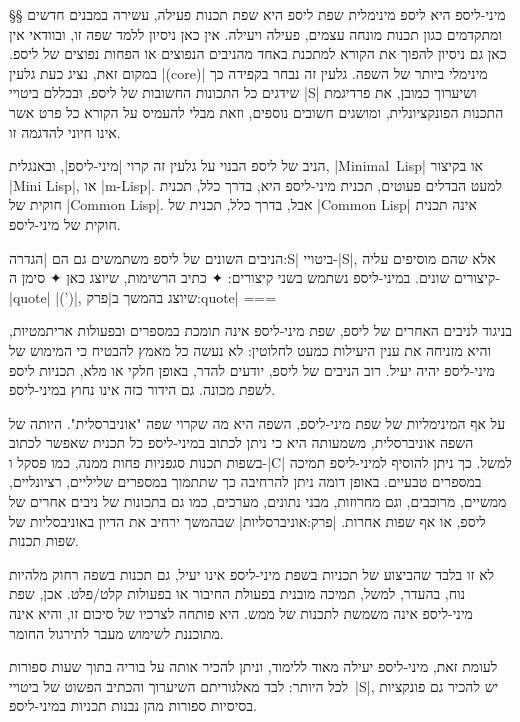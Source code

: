 §§ מיני-ליספ היא ליספ מינימלית 
שפת ליספ היא שפת תכנות פעילה, עשירה במבנים חדשים ומתקדמים כגון תכנות מונחה
עצמים, פעילה ויעילה. אין כאן ניסיון ללמד שפה זו, ובוודאי אין כאן גם ניסיון
להפוך את הקורא למתכנת באחד מהניבים הנפוצים או הפחות נפוצים של ליספ. במקום זאת,
נציג כעת גלעין \E|(core)| מינימלי ביותר של השפה. גלעין זה נבחר בקפידה כך שידגים
כל התכונות החשובות של ליספ, ובכללם ביטויי \E|S| ושיערוך כמובן, את פרדיגמת
התכנות הפונקציונלית, ומושגים חשובים נוספים, וזאת מבלי להעמיס על הקורא כל פרט
אשר אינו חיוני להדגמה זו.

הניב של ליספ הבנוי על גלעין זה קרוי \ע|מיני-ליספ|, ובאנגלית, \E|Minimal~Lisp|
או בקיצור \E|Mini Lisp|, או \E|m-Lisp|. למעט הבדלים פעוטים, תכנית מיני-ליספ
היא, בדרך כלל, תכנית חוקית של \E|Common Lisp|. אבל, בדרך כלל, תכנית של
\E|Common Lisp| אינה תכנית חוקית של מיני-ליספ.

הניבים השונים של ליספ משתמשים גם הם |הגדרה:S| ביטויי-\E|S|, אלא שהם מוסיפים
עליה קיצורים שונים. במיני-ליספ נשתמש בשני קיצורים:
✦ כתיב הרשימות, שיוצג כאן
✦ סימן ה-\E|quote| \E|(')|, שיוצג בהמשך ב|פרק:quote|
===

בניגוד לניבים האחרים של ליספ, שפת מיני-ליספ אינה תומכת במספרים ובפעולות
אריתמטיות, והיא מזניחה את ענין היעילות כמעט לחלוטין: לא נעשה כל מאמץ להבטיח כי
המימוש של מיני-ליספ יהיה יעיל. רוב הניבים של ליספ, יודעים להדר, באופן
חלקי או מלא, תכניות ליספ לשפת מכונה. גם הידור כזה אינו נחוץ במיני-ליספ.

על אף המינימליות של שפת מיני-ליספ, השפה היא מה שקרוי שפה "אוניברסלית". היותה של
השפה אוניברסלית, משמעותה היא כי ניתן לכתוב במיני-ליספ כל תכנית שאפשר לכתוב
בשפות תכנות סגפניות פחות ממנה, כמו פסקל ו-\E|C| למשל. כך ניתן להוסיף למיני-ליספ
תמיכה במספרים טבעיים. באופן דומה ניתן להרחיבה כך שתתמוך במספרים שליליים,
רציונליים, ממשיים, מרוכבים, וגם מחרוזות, מבני נתונים, מערכים, כמו גם בתכונות של
ניבים אחרים של ליספ, או אף שפות אחרות. |פרק:אוניברסליות| שבהמשך ירחיב את
הדיון באוניבסליות של שפות תכנות.

לא זו בלבד שהביצוע של תכניות בשפת מיני-ליספ אינו יעיל, גם תכנות בשפה רחוק
מלהיות נוח, בהעדר, למשל, תמיכה מובנית בפעולת החיבור או בפעולות קלט/פלט. אכן,
שפת מיני-ליספ אינה משמשת לתכנות של ממש. היא פותחה לצרכיו של סיכום זו, והיא אינה
מתוכננת לשימוש מעבר לתירגול החומר.

לעומת זאת, מיני-ליספ יעילה מאוד ללימוד, וניתן להכיר אותה על בוריה בתוך שעות
ספורות לכל היותר: לבד מאלגוריתם השיערוך והכתיב הפשוט של ביטויי~\E|S|, יש להכיר
גם פונקציות בסיסיות ספורות מהן נבנות תכניות במיני-ליספ.

